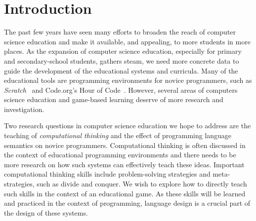 \documentclass{sig-alternate}
\begin{document}



\section{Introduction}

The past few years have seen many efforts to broaden the reach of computer science education and make it available, and appealing, to more students in more places. As the expansion of computer science education, especially for primary and secondary-school students, gathers steam, we need more concrete data to guide the development of the educational systems and curricula. Many of the educational tools are programming environments for novice programmers, such as \emph{Scratch}~\cite{scratch} and Code.org's Hour of Code~\cite{codedotorg}. However, several areas of computers science education and game-based learning deserve of more research and investigation.

Two research questions in computer science education we hope to address are the teaching of \emph{computational thinking} and the effect of programming language semantics on novice programmers. Computational thinking is often discussed in the context of educational programming environments and there needs to be more research on how such systems can effectively teach these ideas. Important computational thinking skills include problem-solving strategies and meta-strategies, such as divide and conquer. We wish to explore how to directly teach such skills in the context of an educational game. As these skills will be learned and practiced in the context of programming, language design is a crucial part of the design of these systems. 
\end{document}
